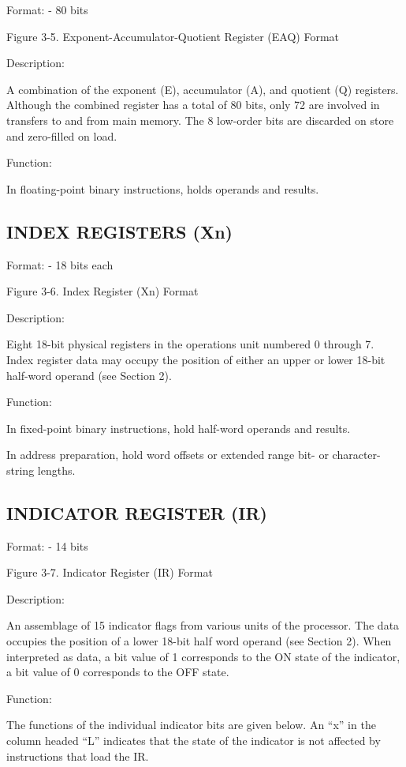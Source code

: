 Format: - 80 bits

Figure 3-5. Exponent-Accumulator-Quotient Register (EAQ) Format

Description:

A combination of the exponent (E), accumulator (A), and quotient (Q) registers.
Although the combined register has a total of 80 bits, only 72 are involved in
transfers to and from main memory. The 8 low-order bits are discarded on store
and zero-filled on load.  

Function:

In floating-point binary instructions, holds operands and results.

\subsection{INDEX REGISTERS (Xn)}

Format: - 18 bits each

Figure 3-6. Index Register (Xn) Format

Description:

Eight 18-bit physical registers in the operations unit numbered 0 through 7.
Index register data may occupy the position of either an upper or lower 18-bit
half-word operand (see Section 2).

Function:

In fixed-point binary instructions, hold half-word operands and results.

In address preparation, hold word offsets or extended range bit- or
character-string lengths.

\subsection{INDICATOR REGISTER (IR)}

Format: - 14 bits

Figure 3-7. Indicator Register (IR) Format

Description:

An assemblage of 15 indicator flags from various units of the processor. The
data occupies the position of a lower 18-bit half word operand (see Section 2).
When interpreted as data, a bit value of 1 corresponds to the ON state of the
indicator, a bit value of 0 corresponds to the OFF state.

Function:

The functions of the individual indicator bits are given below. An {``}x'' in
the column headed {``}L'' indicates that the state of the indicator is not
affected by instructions that load the IR.

